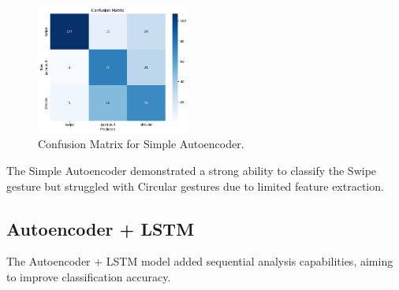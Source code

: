 \documentclass[10pt,twocolumn,letterpaper]{article}
\begin{document}
\begin{table}[h]
\small
\begin{center}
\caption{Performance Metrics for Simple Autoencoder}
\vspace{0.1cm}
\end{center}
\end{table}

\begin{figure}[h]
  \centering
  \includegraphics[width=0.45\textwidth]{figures/confusion_matrix_simple_autoencoder.png}
  \caption{Confusion Matrix for Simple Autoencoder.}
  \label{fig:confusion_matrix_simple_autoencoder}
\end{figure}

The Simple Autoencoder demonstrated a strong ability to classify the Swipe gesture but struggled with Circular gestures due to limited feature extraction.

\subsection{Autoencoder + LSTM}

The Autoencoder + LSTM model added sequential analysis capabilities, aiming to improve classification accuracy.
\end{document}

